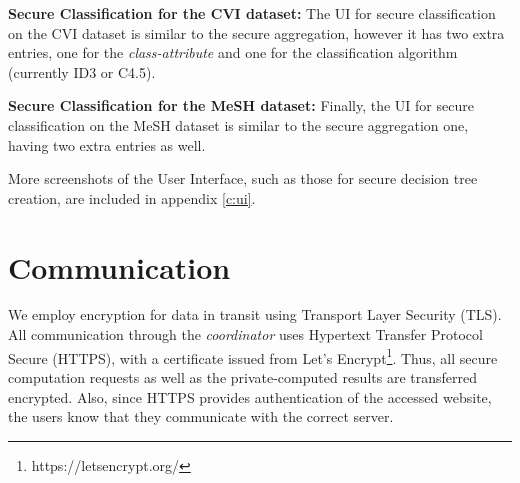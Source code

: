 \textbf{Secure Classification for the CVI dataset:} The UI for secure classification on the CVI dataset is similar to the secure aggregation, however it has two extra entries, one for the \emph{class\hyp attribute} and one for the classification algorithm (currently ID3 or C4.5).

\textbf{Secure Classification for the MeSH dataset:} Finally, the UI for secure classification on the MeSH dataset is similar to the secure aggregation one, having two extra entries as well.


More screenshots of the User Interface, such as those for secure decision tree creation, are included in appendix \ref{c:ui}.


\section{Communication}\label{s:impl-communication}
We employ encryption for data in transit using Transport Layer Security (TLS).
All communication through the \textit{coordinator} uses Hypertext Transfer Protocol Secure (HTTPS), with a certificate issued from Let's Encrypt\footnote{https://letsencrypt.org/}.
Thus, all secure computation requests as well as the private\hyp computed results are transferred encrypted.
Also, since HTTPS provides authentication of the accessed website, the users know that they communicate with the correct server.


